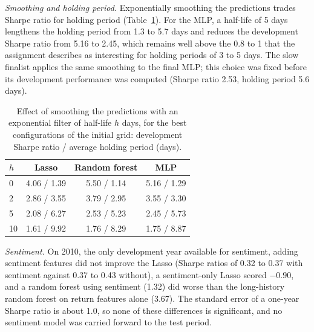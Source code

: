 \textit{Smoothing and holding period.} Exponentially smoothing the predictions trades Sharpe ratio for holding period (Table~\ref{tab:t3_smooth}). For the MLP, a half-life of 5 days lengthens the holding period from 1.3 to 5.7 days and reduces the development Sharpe ratio from 5.16 to 2.45, which remains well above the 0.8 to 1 that the assignment describes as interesting for holding periods of 3 to 5 days. The slow finalist applies the same smoothing to the final MLP; this choice was fixed before its development performance was computed (Sharpe ratio 2.53, holding period 5.6 days).

\begin{table}[t]
\caption{Effect of smoothing the predictions with an exponential filter of half-life $h$ days, for the best configurations of the initial grid: development Sharpe ratio / average holding period (days).}
\label{tab:t3_smooth}
\centering
\small
\begin{tabular}{lccc}
\hline
$h$ & Lasso & Random forest & MLP \\
\hline
0  & 4.06 / 1.39 & 5.50 / 1.14 & 5.16 / 1.29 \\
2  & 2.86 / 3.55 & 3.79 / 2.95 & 3.55 / 3.30 \\
5  & 2.08 / 6.27 & 2.53 / 5.23 & 2.45 / 5.73 \\
10 & 1.61 / 9.92 & 1.76 / 8.29 & 1.75 / 8.87 \\
\hline
\end{tabular}
\end{table}

\textit{Sentiment.} On 2010, the only development year available for sentiment, adding sentiment features did not improve the Lasso (Sharpe ratios of 0.32 to 0.37 with sentiment against 0.37 to 0.43 without), a sentiment-only Lasso scored $-0.90$, and a random forest using sentiment (1.32) did worse than the long-history random forest on return features alone (3.67). The standard error of a one-year Sharpe ratio is about 1.0, so none of these differences is significant, and no sentiment model was carried forward to the test period.

